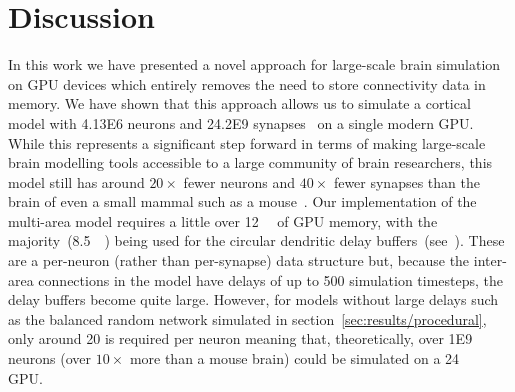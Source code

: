 \documentclass[9pt,a4paper]{amsart}
\begin{document}
\section{Discussion}
In this work we have presented a novel approach for large-scale brain simulation on GPU devices which entirely removes the need to store connectivity data in memory.
We have shown that this approach allows us to simulate a cortical model with \num{4.13E6} neurons and \num{24.2E9} synapses~\citep{Schmidt2018a,Schmidt2018} on a single modern GPU.
While this represents a significant step forward in terms of making large-scale brain modelling tools accessible to a large community of brain researchers, this model still has around $20\times$ fewer neurons and $40\times$ fewer synapses than the brain of even a small mammal such as a mouse~\citep{Herculano-Houzel2010}.
Our implementation of the multi-area model requires a little over \SI{12}{\giga\byte} of GPU memory, with the majority~(\SI{8.5}{\giga\byte}) being used for the circular dendritic delay buffers~(see~\citet{Knight2018}).
These are a per-neuron (rather than per-synapse) data structure but, because the inter-area connections in the model have delays of up to 500 simulation timesteps, the delay buffers become quite large.
However, for models without large delays such as the balanced random network simulated in section~\ref{sec:results/procedural}, only around \SI{20}{\byte} is required per neuron meaning that, theoretically, over \num{1E9} neurons (over $10\times$ more than a mouse brain) could be simulated on a \SI{24}{\giga\byte} GPU.
\end{document}
